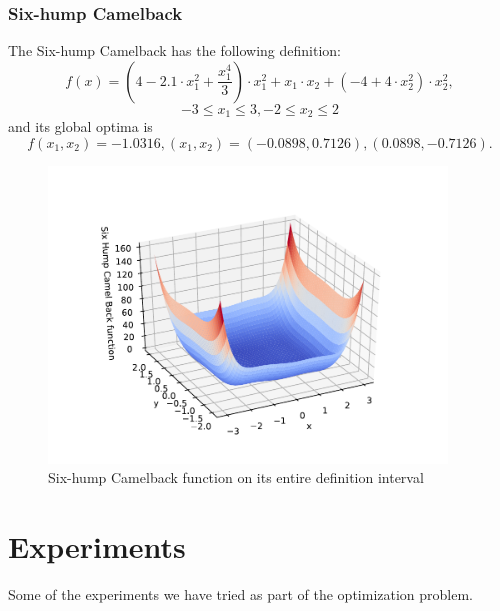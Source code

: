 \documentclass{article}
\begin{document}
\subsubsection{Six-hump Camelback}
The Six-hump Camelback has the following definition:
$$f(x) = \left(4 - 2.1 \cdot x_1^2 + \frac{x_1^4}{3}\right) \cdot x_1 ^2 + x_1 \cdot x_2 + \left(-4 + 4 \cdot x_2^2\right) \cdot x_2^2,$$ $$-3 \leq x_1 \leq 3, -2 \leq x_2 \leq 2$$
and its global optima is $$f(x_1, x_2) = -1.0316, (x_1, x_2) = (-0.0898,0.7126), (0.0898,-0.7126).$$
\begin{figure}[h!]
  \centering
  \includegraphics[width = 300pt]{svg/Sixhumpcamelback_svg-tex.pdf}
  \caption{Six-hump Camelback function on its entire definition interval}
\end{figure}


\section{Experiments}

Some of the experiments we have tried as part of the optimization problem.
\end{document}
